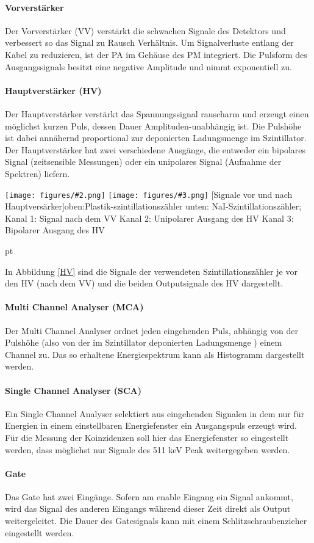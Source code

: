 \documentclass[12pt,listof=totoc]{scrartcl}
\newcommand{\graTwoShort}[5][0.49]{
	\begin{minipage}[h!]{\textwidth}
		\centering
		\texttt{[image: figures/\#2.png]}
		\texttt{[image: figures/\#3.png]}
		\captionof{figure}[#4]{#5}
	\end{minipage}
	\vskip 30 pt
}
\begin{document}
 \paragraph{Vorverstärker}
 Der Vorverstärker (VV) verstärkt die schwachen Signale des Detektors und verbessert so
 das Signal zu Rausch Verhältnis. Um Signalverluste entlang der Kabel zu reduzieren, ist der PA im Gehäuse des PM integriert. Die Pulsform des Ausgangssignals besitzt eine negative Amplitude und nimmt exponentiell zu.
 \paragraph{Hauptverstärker (HV)}
 Der Hauptverstärker  verstärkt das Spannungssignal rauscharm und erzeugt einen möglichst kurzen Puls, dessen Dauer Amplituden-unabhängig ist. Die Pulshöhe ist dabei annähernd proportional zur deponierten Ladungsmenge im Szintillator. Der Hauptverstärker hat zwei verschiedene Ausgänge, die entweder ein bipolares Signal (zeitsensible Messungen) oder ein unipolares Signal (Aufnahme der Spektren) liefern.
 
 \graTwoShort[0.5]{Plastik-Verstaerker}{NaI-Verstaerker}{Signale vor und nach Hauptversärker}{oben:Plastik-szintillationszähler unten: NaI-Szintillationszähler; Kanal 1: Signal nach dem VV Kanal 2: Unipolarer Ausgang des HV Kanal 3: Bipolarer Ausgang des HV \label{HV}}
 
 In Abbildung \ref{HV} sind die Signale der verwendeten Szintillationszähler je vor den HV (nach dem VV) und die beiden Outputsignale des HV dargestellt.
 \paragraph{Multi Channel Analyser (MCA)}
 Der Multi Channel Analyser ordnet jeden eingehenden Puls, abhängig von der Pulshöhe (also von der im Szintillator deponierten Ladungsmenge ) einem Channel zu. Das so erhaltene Energiespektrum kann als Histogramm dargestellt werden.
 \paragraph{Single Channel Analyser (SCA)}
 Ein Single Channel Analyser selektiert aus eingehenden Signalen in dem nur für Energien in einem einstellbaren Energiefenster ein Ausgangspuls erzeugt wird.  Für die Messung der Koinzidenzen soll hier das Energiefenster so eingestellt werden, dass möglichst nur Signale des 511 keV Peak weitergegeben werden.
 \paragraph{Gate} Das Gate hat zwei Eingänge. Sofern am enable Eingang ein Signal ankommt, wird das Signal des anderen Eingangs während dieser Zeit direkt als Output weitergeleitet. Die Dauer des Gatesignals kann mit einem Schlitzschraubenzieher eingestellt werden.
\end{document}
